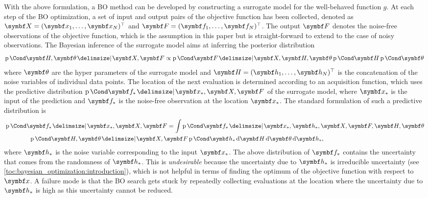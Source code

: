 With the above formulation, a BO method can be developed by constructing a surrogate model for the well-behaved function $g$.
At each step of the BO optimization, a set of input and output pairs of the objective function has been collected, denoted as $\mat{X} = (\mat{x}_1, \ldots, \mat{x}_N)^\top$ and $\mat{F} = (\mat{f}_1, \ldots, \mat{f}_N)^\top$.
The output $\mat{F}$ denotes the noise-free observations of the objective function, which is the assumption in this paper but is straight-forward to extend to the case of noisy observations.
The Bayesian inference of the surrogate model aims at inferring the posterior distribution
\begin{equation}
    \Prob{ \mat{H}, \mat{\theta} \given \mat{X}, \mat{F}}  \propto \Prob{\mat{F} \given \mat{X}, \mat{H}, \mat{\theta} }\Prob{\mat{H}}  \Prob{\mat{\theta}}
\end{equation}
where $\mat{\theta}$ are the hyper parameters of the surrogate model and $\mat{H} = (\mat{h}_1, \ldots, \mat{h}_N)^\top$ is the concatenation of the noise variables of individual data points.
The location of the next evaluation is determined according to an acquisition function,
which uses the predictive distribution $\Prob{\mat{f}_* \given \mat{x}_*,  \mat{X}, \mat{F}}$ of the surrogate model,
where $\mat{x}_*$ is the input of the prediction and $\mat{f}_*$ is the noise-free observation at the location $\mat{x}_*$.
The standard formulation of such a predictive distribution is
\begin{align}
    \begin{split}
        \MoveEqLeft\Prob{\mat{f}_* \given \mat{x}_*,  \mat{X}, \mat{F}} =
        \int \Prob{\mat{f}_* \given \mat{x}_*, \mat{h}_*, \mat{X}, \mat{F},\mat{H}, \mat{\theta}}\\
        &\qquad\Prob{\mat{H}, \mat{\theta} \given \mat{X}, \mat{F}} \Prob{\mat{h}_*} \diff{\mat{H}}\diff{\mat{\theta}}\diff{\mat{h}_*},
    \end{split}
\end{align}
where $\mat{h}_*$ is the noise variable corresponding to the input $\mat{x}_*$.
The above distribution of $\mat{f}_*$ contains the uncertainty that comes from the randomness of $\mat{h}_*$.
This is \textit{undesirable} because the uncertainty due to $\mat{h}_*$ is irreducible uncertainty (see \cref{toc:bayesian_optimization:introduction}), which is not helpful in terms of finding the optimum of the objective function with respect to $\mat{x}$.
A failure mode is that the BO search gets stuck by repeatedly collecting evaluations at the location where the uncertainty due to $\mat{h}_*$ is high as this uncertainty cannot be reduced.
